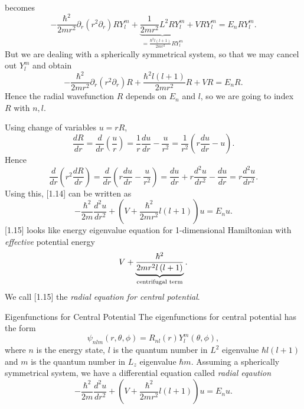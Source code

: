 \documentclass[phys334]{subfiles}
\begin{document}
    becomes
    \begin{equation*}
        -\frac{\hbar^{2}}{2mr^{2}}\partial_r\left( r^{2}\partial_r \right) RY_l^m + \underbrace{\frac{1}{2mr^{2}}L^{2}RY_l^m}_{=\frac{\hbar^{2}l\left( l+1 \right)}{2mr^{2}}RY_l^m} + VRY_l^m = E_nRY_l^m.
    \end{equation*}
    But we are dealing with a spherically symmetrical system, so that we may cancel out $Y_l^m$ and obtain
    \begin{equation}
        -\frac{\hbar^{2}}{2mr^{2}}\partial_r\left( r^{2}\partial_r \right) R + \frac{\hbar^{2}l\left( l+1 \right)}{2mr^{2}}R+ VR = E_nR.
    \end{equation}
    Hence the radial wavefunction $R$ depends on $E_n$ and $l$, so we are going to index $R$ with $n,l$.

    Using change of variables $u = rR$,
    \begin{equation*}
        \frac{dR}{dr} = \frac{d}{dr} \left(\frac{u}{r}\right) = \frac{1}{r} \frac{du}{dr} - \frac{u}{r^{2}} = \frac{1}{r^{2}}\left( r \frac{du}{dr}-u \right).
    \end{equation*}
    Hence
    \begin{equation*}
        \frac{d}{dr}\left( r^{2} \frac{dR}{dr} \right) = \frac{d}{dr}\left( r \frac{du}{dr}-\frac{u}{r^{2}}  \right) = \frac{du}{dr} + r \frac{d^{2}u}{dr^{2}} - \frac{du}{dr} = r \frac{d^{2}u}{dr^{2}}.
    \end{equation*}
    Using this, [1.14] can be written as
    \begin{equation}
        -\frac{\hbar^{2}}{2m} \frac{d^{2}u}{dr^{2}} + \left( V + \frac{\hbar^{2}}{2mr^{2}}l\left( l+1 \right) \right)u = E_nu.
    \end{equation}
    [1.15] looks like energy eigenvalue equation for 1-dimensional Hamiltonian with \textit{effective} potential energy
    \begin{equation*}
        V + \underbrace{\frac{\hbar^{2}}{2mr^{2}l\left( l+1 \right)}}_{\clap{\text{\scriptsize centrifugal term}}}.
    \end{equation*}
    We call [1.15] the \textit{radial equation for central potential}.

    \begin{summary}{Eigenfunctions for Central Potential}
        The eigenfunctions for central potential has the form
        \begin{equation*}
            \psi_{nlm}\left( r,\theta,\phi \right) = R_{nl}\left( r \right) Y_l^m \left( \theta,\phi \right),
        \end{equation*}
        where $n$ is the energy state, $l$ is the quantum number in $L^{2}$ eigenvalue $\hbar l\left( l+1 \right)$ and $m$ is the quantum number in $L_z$ eigenvalue $\hbar m$. Assuming a spherically symmetrical system, we have a differential equation called \textit{radial eqaution}
        \begin{equation*}
            -\frac{\hbar^{2}}{2m} \frac{d^{2}u}{dr^{2}} + \left( V + \frac{\hbar^{2}}{2mr^{2}}l\left( l+1 \right) \right)u = E_nu.
        \end{equation*}
    \end{summary}
\end{document}
